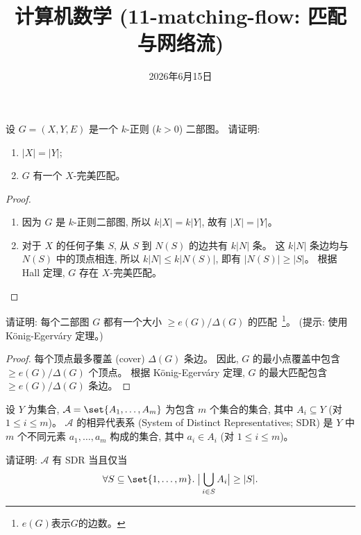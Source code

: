 \documentclass[a4paper, justified]{tufte-handout}
\title{计算机数学 (11-matching-flow: 匹配与网络流)}
\date{2026年6月15日}
\begin{document}
\maketitle
\noplagiarism %
\begin{abstract}
\end{abstract}
\beginrequired

\begin{problem}
  设 $G = (X, Y, E)$ 是一个 $k$-正则 ($k > 0$) 二部图。
  请证明:
  \begin{enumerate}[(1)]
    \item $|X| = |Y|$;
    \item $G$ 有一个 $X$-完美匹配。
  \end{enumerate}
\end{problem}

\begin{proof}
  \begin{enumerate}[(1)]
    \item 因为 $G$ 是 $k$-正则二部图, 所以 $k |X| = k |Y|$, 故有 $|X| = |Y|$。
    \item 对于 $X$ 的任何子集 $S$, 从 $S$ 到 $N(S)$ 的边共有 $k|N|$ 条。
      这 $k|N|$ 条边均与 $N(S)$ 中的顶点相连, 所以 $k|N| \le k|N(S)|$,
      即有 $|N(S)| \ge |S|$。
      根据 Hall 定理, $G$ 存在 $X$-完美匹配。
  \end{enumerate}
\end{proof}

\begin{problem}
  请证明: 每个二部图 $G$ 都有一个大小 $\ge e(G)/\Delta(G)$ 的匹配~\footnote{$e(G)$表示$G$的边数。}。
  (提示: 使用 K\"{o}nig-Egerv\'{a}ry 定理。)
\end{problem}

\begin{proof}
  每个顶点最多覆盖 (cover) $\Delta(G)$ 条边。
  因此, $G$ 的最小点覆盖中包含 $\ge e(G)/\Delta(G)$ 个顶点。
  根据 K\"{o}nig-Egerv\'{a}ry 定理, $G$ 的最大匹配包含 $\ge e(G)/\Delta(G)$ 条边。
\end{proof}

\begin{problem}
  设 $Y$ 为集合,
  $\mathcal{A} = \set{A_{1}, \dots, A_{m}}$
  为包含 $m$ 个集合的集合, 其中 $A_{i} \subseteq Y$ (对 $1 \le i \le m$)。
  $\mathcal{A}$ 的相异代表系 (System of Distinct Representatives; SDR)
  是 $Y$ 中 $m$ 个不同元素 $a_{1}, \dots, a_{m}$ 构成的集合,
  其中 $a_{i} \in A_{i}$ (对 $1 \le i \le m$)。

  \noindent 请证明: $\mathcal{A}$ 有 SDR 当且仅当
  \[
    \forall S \subseteq \set{1, \dots, m}.\;
      \big\lvert \bigcup_{i \in S} A_{i} \big\rvert \ge |S|.
  \]
\end{problem}
\end{document}
